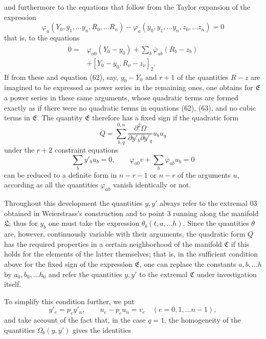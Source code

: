\documentclass[11pt,a4paper,leqno]{article}
\begin{document}
and furthermore to the equations that follow from the Taylor expansion
of the expression
\[
\varphi_a(Y_0,y_1,\ldots y_n,R_0,\ldots R_n)
-\varphi_a(y_0,y_1,\ldots y_n,z_0,\ldots z_n)=0
\]
that is, to the equations
\begin{equation}\tag{63}
\begin{aligned}
0={}&\varphi_{a0}(Y_0-y_0)+\sum_b\overline{\varphi}_{ab}(R_b-z_b)\\
&+[Y_0-y_0,R_\nu-z_\nu]_2.
\end{aligned}
\end{equation}
If from these and equation (62), say, $y_0-Y_0$ and $r+1$ of the
quantities $R-z$ are imagined to be expressed as power series in the
remaining ones, one obtains for $\mathfrak{E}$ a power series in these
same arguments, whose quadratic terms are formed exactly as if there
were no quadratic terms in equations (62), (63), and no cubic terms in
$\mathfrak{E}$. The quantity $\mathfrak{E}$ therefore has a fixed sign
if the quadratic form
\[
Q=\sum_{b,q}^{0,n}
\frac{\partial^2\Omega}{\partial y'_b\partial y'_q}u_bu_q
\]
under the $r+2$ constraint equations
\begin{equation}\tag{64}
\sum_b y'_b u_b=0,\qquad
\varphi_{a0}v+\sum_b\overline{\varphi}_{ab}u_b=0
\end{equation}
can be reduced to a definite form in $n-r-1$ or $n-r$ of the arguments
$u$, according as all the quantities $\varphi_{a0}$ vanish identically
or not.

Throughout this development the quantities $y,y'$ always refer to the
extremal 03 obtained in Weierstrass's construction and to point 3
running along the manifold $\mathfrak{L}$; thus for $y_b$ one must take
the expression $\theta_b(t,a,\ldots h)$. Since the quantities $\theta$
are, however, continuously variable with their arguments, the
quadratic form $Q$ has the required properties in a certain
neighborhood of the manifold $\mathfrak{C}$ if this holds for the
elements of the latter themselves; that is, in the sufficient
condition above for the fixed sign of the expression $\mathfrak{E}$,
one can replace the constants $a,b,\ldots h$ by $a_0,b_0,\ldots h_0$
and refer the quantities $y,y'$ to the extremal $\mathfrak{C}$ under
investigation itself.

To simplify this condition further, we put
\[
y'_e=p_e y'_n,\qquad u_e-p_eu_n=v_e
\quad(e=0,1,\ldots n-1),
\]
and take account of the fact that, in the case $q=1$, the homogeneity
of the quantities $\Omega_b(y,y')$ gives the identities
\end{document}
